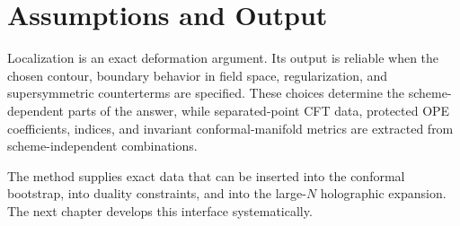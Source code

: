 \section{Assumptions and Output}

Localization is an exact deformation argument.  Its output is reliable when
the chosen contour, boundary behavior in field space, regularization, and
supersymmetric counterterms are specified.  These choices determine the
scheme-dependent parts of the answer, while separated-point CFT data,
protected OPE coefficients, indices, and invariant conformal-manifold metrics
are extracted from scheme-independent combinations.

The method supplies exact data that can be inserted into the conformal
bootstrap, into duality constraints, and into the large-\(N\) holographic
expansion.  The next chapter develops this interface systematically.
